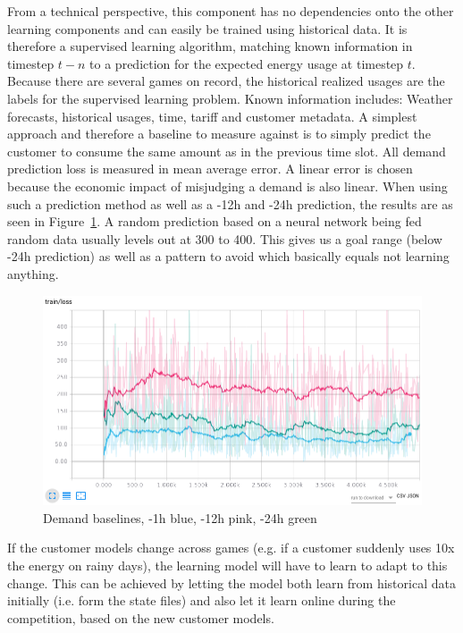 From a technical perspective, this component has no dependencies onto the other learning components and can easily be
trained using historical data.  It is therefore a supervised learning algorithm, matching known information in timestep
$t-n$ to a prediction for the expected energy usage at timestep $t$. Because there are several games on record, the
historical realized usages are the labels for the supervised learning problem. Known information includes: Weather
forecasts, historical usages, time, tariff and customer metadata. A simplest approach and therefore a baseline to
measure against is to simply predict the customer to consume the same amount as in the previous time slot. All demand
prediction loss is measured in mean average error. A linear error is chosen because the economic impact of misjudging a
demand is also linear. When using such a prediction method as well as a -12h and -24h prediction, the results are as
seen in Figure~\ref{fig:demand_baseline}. A random prediction based on a neural network being fed random data usually
levels out at 300 to 400. This gives us a goal range (below -24h prediction) as well as a pattern to avoid which
basically equals not learning anything.

\begin{figure}[]
    \centering
    \includegraphics[width=0.8\linewidth]{img/demand_baselines.png}
    \caption{Demand baselines, -1h blue, -12h pink, -24h green}
    \label{fig:demand_baseline}
\end{figure}

If the customer models change across games (e.g. if a customer suddenly uses 10x the energy on rainy days), the learning
model will have to learn to adapt to this change. This can be achieved by letting the model both learn from historical
data initially (i.e. form the state files) and also let it learn online during the competition, based on the new
customer models.

